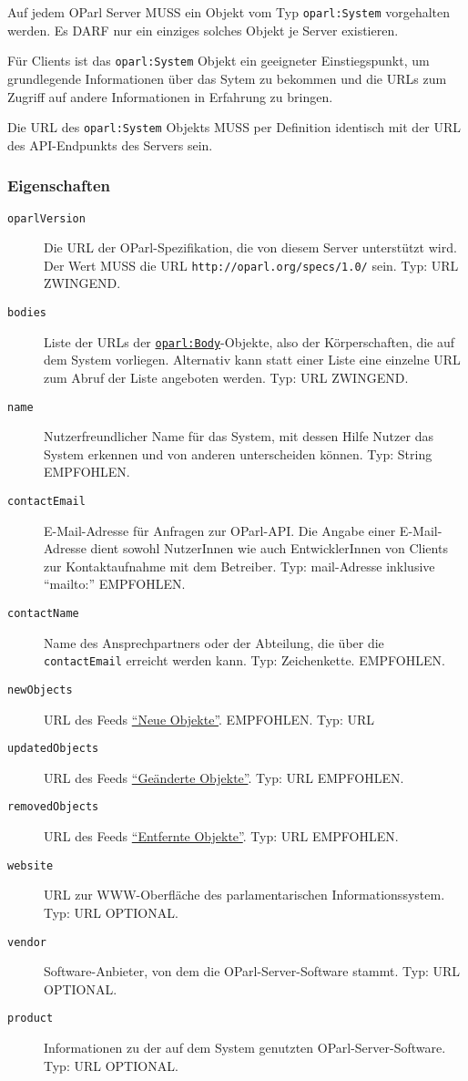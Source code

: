 \documentclass[,a4paper]{article}
\begin{document}
Auf jedem OParl Server MUSS ein Objekt vom Typ \texttt{oparl:System}
vorgehalten werden. Es DARF nur ein einziges solches Objekt je Server
existieren.

Für Clients ist das \texttt{oparl:System} Objekt ein geeigneter
Einstiegspunkt, um grundlegende Informationen über das Sytem zu bekommen
und die URLs zum Zugriff auf andere Informationen in Erfahrung zu
bringen.

Die URL des \texttt{oparl:System} Objekts MUSS per Definition identisch
mit der URL des API-Endpunkts des Servers sein.

\subsubsection{Eigenschaften}\label{eigenschaften}

\begin{description}
\item[\texttt{oparlVersion}]
Die URL der OParl-Spezifikation, die von diesem Server unterstützt wird.
Der Wert MUSS die URL \texttt{http://oparl.org/specs/1.0/} sein. Typ:
URL ZWINGEND.
\item[\texttt{bodies}]
Liste der URLs der
\hyperref[oparlux5fbody]{\texttt{oparl:Body}}-Objekte, also der
Körperschaften, die auf dem System vorliegen. Alternativ kann statt
einer Liste eine einzelne URL zum Abruf der Liste angeboten werden. Typ:
URL ZWINGEND.
\item[\texttt{name}]
Nutzerfreundlicher Name für das System, mit dessen Hilfe Nutzer das
System erkennen und von anderen unterscheiden können. Typ: String
EMPFOHLEN.
\item[\texttt{contactEmail}]
E-Mail-Adresse für Anfragen zur OParl-API. Die Angabe einer
E-Mail-Adresse dient sowohl NutzerInnen wie auch EntwicklerInnen von
Clients zur Kontaktaufnahme mit dem Betreiber. Typ: mail-Adresse
inklusive ``mailto:'' EMPFOHLEN.
\item[\texttt{contactName}]
Name des Ansprechpartners oder der Abteilung, die über die
\texttt{contactEmail} erreicht werden kann. Typ: Zeichenkette.
EMPFOHLEN.
\item[\texttt{newObjects}]
URL des Feeds \hyperref[feedux5fneueux5fobjekte]{``Neue Objekte''}.
EMPFOHLEN. Typ: URL
\item[\texttt{updatedObjects}]
URL des Feeds \hyperref[feedux5fgeaenderteux5fobjekte]{``Geänderte
Objekte''}. Typ: URL EMPFOHLEN.
\item[\texttt{removedObjects}]
URL des Feeds \hyperref[feedux5fentfernteux5fobjekte]{``Entfernte
Objekte''}. Typ: URL EMPFOHLEN.
\item[\texttt{website}]
URL zur WWW-Oberfläche des parlamentarischen Informationssystem. Typ:
URL OPTIONAL.
\item[\texttt{vendor}]
Software-Anbieter, von dem die OParl-Server-Software stammt. Typ: URL
OPTIONAL.
\item[\texttt{product}]
Informationen zu der auf dem System genutzten OParl-Server-Software.
Typ: URL OPTIONAL.
\end{description}
\end{document}
